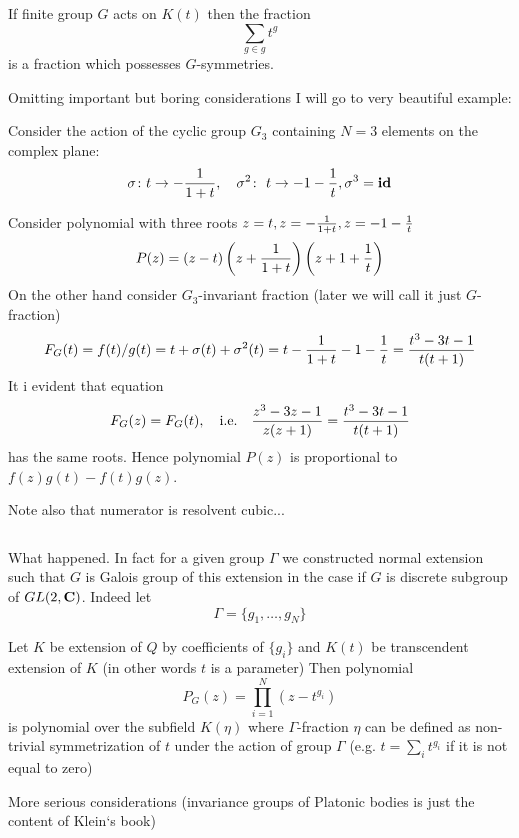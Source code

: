   If finite group $G$ acts on $K(t)$ then the fraction
                       $$
                       \sum_{g\in g}t^g
                       $$
                       is a fraction which possesses $G$-symmetries.

Omitting important but boring considerations I will go to very beautiful example:

   Consider the action of the cyclic group $G_3$ containing $N=3$ elements on
   the complex plane:
                        $$
          \sigma\colon t\to -{1\over 1+t},\quad\sigma^2\colon\,\,
           t\to -1-{1\over t},\sigma^3={\bf id}
                            $$

Consider polynomial with three roots $z=t,z=-{1\over 1+t}, z=-1-{1\over t}$
                        $$
                        P(z)=\left(z-t\right)\left(z+{1\over 1+t}\right)
                        \left(z+1+{1\over t}\right)
                        $$
On the other hand consider $G_3$-invariant fraction (later we will call it just
$G$-fraction)
                        $$
             F_G(t)=f(t)/g(t)=t+\sigma(t)+\sigma^2(t)=t-{1\over 1+t}-1-{1\over t}=
                            {t^3-3t-1\over t(t+1)}
                        $$
   It i evident that equation
                        $$
   F_G(z)=F_G(t),\quad {\rm i.e.}\quad {z^3-3z-1\over z(z+1)}={t^3-3t-1\over t(t+1)}
                     $$
has the same roots. Hence polynomial $P(z)$ is proportional to $f(z)g(t)-f(t)g(z)$.

Note also that numerator is resolvent cubic...

$$ $$


What happened. In fact for a given group $\Gamma$ we constructed normal extension such
that $G$ is Galois group of this extension in the case if $G$ is discrete subgroup of
$GL(2,{\bf C})$. Indeed let
                           $$
           \Gamma=\{g_1,\dots,g_N\}
                          $$

        Let $K$ be extension of $Q$ by coefficients of $\{g_i\}$
        and $K(t)$ be transcendent extension of $K$
        (in other words $t$ is a parameter) Then polynomial
                                         $$
            P_G(z)=\prod_{i=1}^N(z-t^{g_i})
                        $$
is polynomial over the subfield $K(\eta)$ where $\Gamma$-fraction $\eta$ can be defined
as non-trivial symmetrization of $t$ under the action of group $\Gamma$ (e.g. $t=\sum_i
t^{g_i}$ if it is not equal to zero)

More serious considerations (invariance groups of Platonic bodies is just the content
of Klein`s book)

